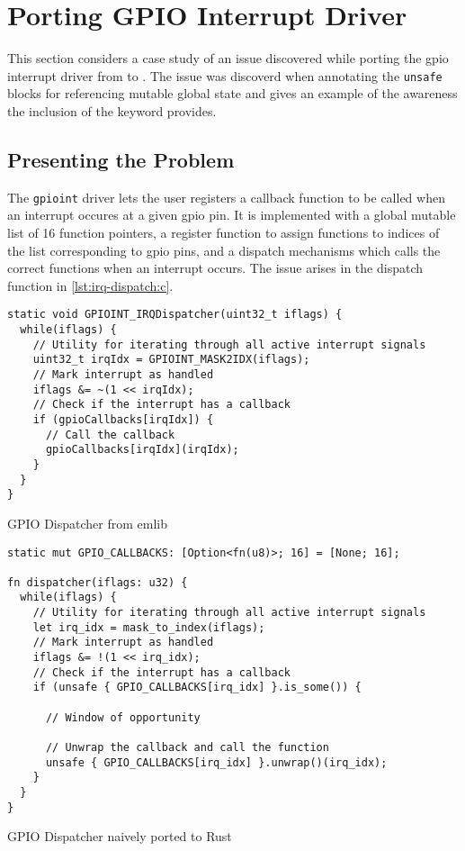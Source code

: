 \section{Porting GPIO Interrupt Driver}
\label{sec:porting-gpioint}
This section considers a case study of an issue discovered while porting the \gls{gpio} interrupt driver from  to {\rust}.
The issue was discoverd when annotating the \texttt{unsafe} blocks for referencing mutable global state and gives an example of the awareness the inclusion of the {\unsafe} keyword provides.

\subsection{Presenting the Problem}

The \texttt{gpioint} driver lets the user registers a callback function to be called when an interrupt occures at a given \gls{gpio} pin.
It is implemented with a global mutable list of 16 function pointers, a register function to assign functions to indices of the list corresponding to \gls{gpio} pins, and a dispatch mechanisms which calls the correct functions when an interrupt occurs.
The issue arises in the dispatch function in \autoref{lst:irq-dispatch:c}.

\begin{listing}
  \begin{verbatim}
static void GPIOINT_IRQDispatcher(uint32_t iflags) {
  while(iflags) {
    // Utility for iterating through all active interrupt signals
    uint32_t irqIdx = GPIOINT_MASK2IDX(iflags);
    // Mark interrupt as handled
    iflags &= ~(1 << irqIdx);
    // Check if the interrupt has a callback
    if (gpioCallbacks[irqIdx]) {
      // Call the callback
      gpioCallbacks[irqIdx](irqIdx);
    }
  }
}
  \end{verbatim}
  \caption{GPIO Dispatcher from emlib}
  \label{lst:irq-dispatch:c}
\end{listing}

\begin{listing}
  \begin{verbatim}
static mut GPIO_CALLBACKS: [Option<fn(u8)>; 16] = [None; 16];

fn dispatcher(iflags: u32) {
  while(iflags) {
    // Utility for iterating through all active interrupt signals
    let irq_idx = mask_to_index(iflags);
    // Mark interrupt as handled
    iflags &= !(1 << irq_idx);
    // Check if the interrupt has a callback
    if (unsafe { GPIO_CALLBACKS[irq_idx] }.is_some()) {

      // Window of opportunity

      // Unwrap the callback and call the function
      unsafe { GPIO_CALLBACKS[irq_idx] }.unwrap()(irq_idx);
    }
  }
}
  \end{verbatim}
  \caption{GPIO Dispatcher naively ported to Rust}
  \label{lst:irq-dispatch:rust}
\end{listing}


